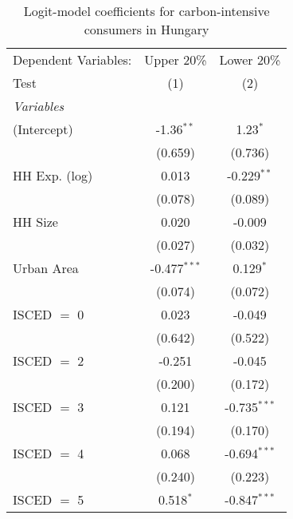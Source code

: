 
\begin{table}[htbp!]
   \centering
   \small
   \begin{adjustbox}{width = 1\textwidth, max height = 0.95\textheight, center}
      \begin{threeparttable}[b]
         \caption{\label{tab:Logit_1_HUN} Logit-model coefficients for carbon-intensive consumers in Hungary}
         \begin{tabular}{lcc}
            \tabularnewline \midrule \midrule
            Dependent Variables: & Upper 20\%     & Lower 20\%\\   
            Test                 & (1)            & (2)\\  
            \midrule
            \emph{Variables}\\
            (Intercept)          & -1.36$^{**}$   & 1.23$^{*}$\\   
                                 & (0.659)        & (0.736)\\   
            HH Exp. (log)        & 0.013          & -0.229$^{**}$\\   
                                 & (0.078)        & (0.089)\\   
            HH Size              & 0.020          & -0.009\\   
                                 & (0.027)        & (0.032)\\   
            Urban Area           & -0.477$^{***}$ & 0.129$^{*}$\\   
                                 & (0.074)        & (0.072)\\   
            ISCED $=$ 0          & 0.023          & -0.049\\   
                                 & (0.642)        & (0.522)\\   
            ISCED $=$ 2          & -0.251         & -0.045\\   
                                 & (0.200)        & (0.172)\\   
            ISCED $=$ 3          & 0.121          & -0.735$^{***}$\\   
                                 & (0.194)        & (0.170)\\   
            ISCED $=$ 4          & 0.068          & -0.694$^{***}$\\   
                                 & (0.240)        & (0.223)\\   
            ISCED $=$ 5          & 0.518$^{*}$    & -0.847$^{***}$\\   

\end{tabular}
\end{threeparttable}
\end{adjustbox}
\end{table}

